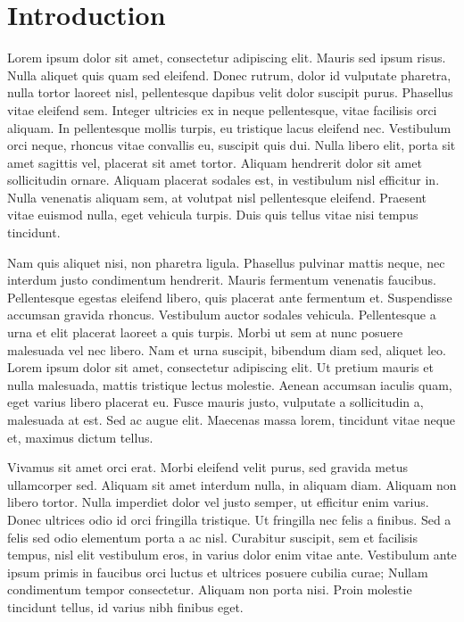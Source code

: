 \chapter{Introduction}%
\label{chp:introduction}

Lorem ipsum dolor sit amet, consectetur adipiscing elit.
Mauris sed ipsum risus.
Nulla aliquet quis quam sed eleifend.
Donec rutrum, dolor id vulputate pharetra, nulla tortor laoreet nisl,
pellentesque dapibus velit dolor suscipit purus.
Phasellus vitae eleifend sem.
Integer ultricies ex in neque pellentesque, vitae facilisis orci aliquam.
In pellentesque mollis turpis, eu tristique lacus eleifend nec.
Vestibulum orci neque, rhoncus vitae convallis eu, suscipit quis dui.
Nulla libero elit, porta sit amet sagittis vel, placerat sit amet tortor.
Aliquam hendrerit dolor sit amet sollicitudin ornare.
Aliquam placerat sodales est, in vestibulum nisl efficitur in.
Nulla venenatis aliquam sem, at volutpat nisl pellentesque eleifend.
Praesent vitae euismod nulla, eget vehicula turpis.
Duis quis tellus vitae nisi tempus tincidunt.

Nam quis aliquet nisi, non pharetra ligula.
Phasellus pulvinar mattis neque, nec interdum justo condimentum hendrerit.
Mauris fermentum venenatis faucibus.
Pellentesque egestas eleifend libero, quis placerat ante fermentum et.
Suspendisse accumsan gravida rhoncus.
Vestibulum auctor sodales vehicula.
Pellentesque a urna et elit placerat laoreet a quis turpis.
Morbi ut sem at nunc posuere malesuada vel nec libero.
Nam et urna suscipit, bibendum diam sed, aliquet leo.
Lorem ipsum dolor sit amet, consectetur adipiscing elit.
Ut pretium mauris et nulla malesuada, mattis tristique lectus molestie.
Aenean accumsan iaculis quam, eget varius libero placerat eu.
Fusce mauris justo, vulputate a sollicitudin a, malesuada at est.
Sed ac augue elit.
Maecenas massa lorem, tincidunt vitae neque et, maximus dictum tellus.

Vivamus sit amet orci erat.
Morbi eleifend velit purus, sed gravida metus ullamcorper sed.
Aliquam sit amet interdum nulla, in aliquam diam.
Aliquam non libero tortor.
Nulla imperdiet dolor vel justo semper, ut efficitur enim varius.
Donec ultrices odio id orci fringilla tristique.
Ut fringilla nec felis a finibus.
Sed a felis sed odio elementum porta a ac nisl.
Curabitur suscipit, sem et facilisis tempus, nisl elit vestibulum eros, in
varius dolor enim vitae ante.
Vestibulum ante ipsum primis in faucibus orci luctus et ultrices posuere cubilia
curae; Nullam condimentum tempor consectetur.
Aliquam non porta nisi.
Proin molestie tincidunt tellus, id varius nibh finibus eget.

